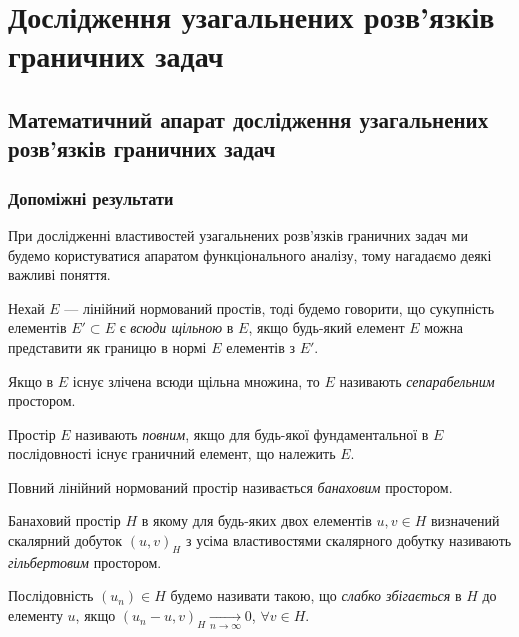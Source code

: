 \setcounter{section}{4}

\section{Дослідження узагальнених розв'язків граничних задач}

\subsection{Математичний апарат дослідження узагальнених розв'язків граничних задач}

\subsubsection{Допоміжні результати}

При дослідженні властивостей узагальнених розв'язків граничних задач ми будемо користуватися апаратом функціонального аналізу, тому нагадаємо деякі важливі поняття.

\begin{definition}
    Нехай $E$ --- лінійний нормований простів, тоді будемо говорити, що сукупність елементів $E' \subset E$ є \emph{всюди щільною} в $E$, якщо будь-який елемент $E$ можна представити як границю в нормі $E$ елементів з $E'$.
\end{definition}

\begin{definition}
    Якщо в $E$ існує злічена всюди щільна множина, то $E$ називають \emph{сепарабельним} простором.
\end{definition}

\begin{definition}
    Простір $E$ називають \emph{повним}, якщо для будь-якої фундаментальної в $E$ послідовності існує граничний елемент, що належить $E$.
\end{definition}

\begin{definition}
    Повний лінійний нормований простір називається \emph{банаховим} простором.
\end{definition}

\begin{definition}
    Банаховий простір $H$ в якому для будь-яких двох елементів $u, v \in H$ визначений скалярний добуток $(u, v)_H$ з усіма властивостями скалярного добутку називають \emph{гільбертовим} простором.
\end{definition}

\begin{definition}
    Послідовність $(u_n) \in H$ будемо називати такою, що \emph{слабко збігається} в $H$ до елементу $u$, якщо $(u_n - u, v)_H \xrightarrow[n \to \infty]{} 0$, $\forall v \in H$. 
\end{definition}

